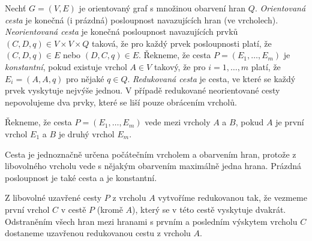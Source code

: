 \begin{definice}
    Nechť $G = (V, E)$ je orientovaný graf s množinou obarvení hran $Q$.
    \emph{Orientovaná cesta} je konečná (i prázdná) posloupnost navazujících hran (ve vrcholech).
    \emph{Neorientovaná cesta} je konečná posloupnost navazujících prvků $(C,D,q) \in V \times V \times Q$ taková, že pro každý prvek posloupnosti platí, že $(C,D,q) \in E$ nebo $(D,C,q) \in E$. 
    Řekneme, že cesta $P = (E_1, \dots, E_m)$
    je \emph{konstantní}, pokud existuje vrchol $A \in V$ takový, že pro $i = 1,\dots,m $ platí, že $E_i = (A,A,q)$ pro nějaké $q \in Q$. 
    \emph{Redukovaná cesta} je cesta, ve které se každý prvek vyskytuje nejvýše jednou. V případě redukované neorientované cesty nepovolujeme dva prvky, které se liší pouze obrácením vrcholů.

    Řekneme, že cesta $P = (E_1, \dots, E_m)$ vede mezi vrcholy $A$ a $B$, pokud $A$ je první vrchol $E_1$ a $B$ je druhý vrchol $E_m$. 
\end{definice}
\begin{pozn}
    Cesta je jednoznačně určena počátečním vrcholem a obarvením hran, protože z libovolného vrcholu vede s nějakým obarvením maximálně jedna hrana. Prázdná posloupnost je také cesta a je konstantní. 
\end{pozn}
\begin{pozn}\label{pozn-redukce-cesty}
    Z libovolné uzavřené cesty $P$ z vrcholu $A$ vytvoříme redukovanou tak, že vezmeme první vrchol $C$ v cestě $P$ (kromě $A$), který se v této cestě vyskytuje dvakrát. Odstraněním všech hran mezi hranami s prvním a posledním výskytem vrcholu $C$ dostaneme uzavřenou redukovanou cestu z vrcholu $A$.
\end{pozn}
    
